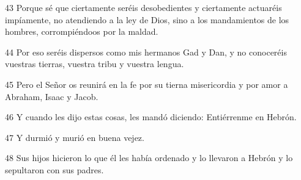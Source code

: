 \par 43 Porque sé que ciertamente seréis desobedientes y ciertamente actuaréis impíamente, no atendiendo a la ley de Dios, sino a los mandamientos de los hombres, corrompiéndoos por la maldad.

\par 44 Por eso seréis dispersos como mis hermanos Gad y Dan, y no conoceréis vuestras tierras, vuestra tribu y vuestra lengua.

\par 45 Pero el Señor os reunirá en la fe por su tierna misericordia y por amor a Abraham, Isaac y Jacob.

\par 46 Y cuando les dijo estas cosas, les mandó diciendo: Entiérrenme en Hebrón.

\par 47 Y durmió y murió en buena vejez.

\par 48 Sus hijos hicieron lo que él les había ordenado y lo llevaron a Hebrón y lo sepultaron con sus padres.

